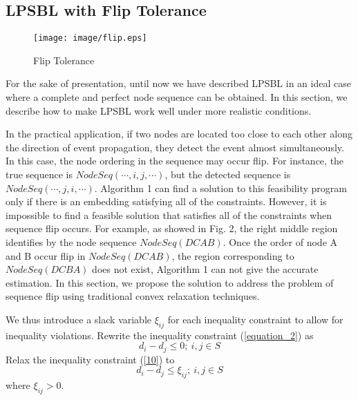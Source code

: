 \subsection{LPSBL with Flip Tolerance }

    \begin{figure}[!htb]
    \centering
 \setlength{\abovecaptionskip}{-15pt}
                     \vspace{-5mm}  
    \texttt{[image: image/flip.eps]} 
	\vspace{10mm}
    \caption{Flip Tolerance}
	\label{fig2}
    \vspace{-5mm}
    \end{figure}

For the sake of presentation, until now we have described LPSBL in an ideal case where a complete and perfect node sequence can be obtained. 
In this section, we describe how to make LPSBL work well under more realistic conditions. 

In the practical application, if two nodes are located too close to each other along the direction of event propagation, they detect the event almost simultaneously. 
In this case, the node ordering in the sequence may occur flip. 
For instance, the true sequence is $NodeSeq ( \cdots ,i,j, \cdots )$, but the detected sequence is $NodeSeq ( \cdots ,j,i, \cdots )$.
Algorithm 1 can find a solution to this feasibility program only if there is an embedding satisfying all of the constraints. 
However, it is impossible to find a feasible solution that satisfies all of the constraints when sequence flip occurs. 
For example, as showed in Fig. 2, the right middle region identifies by the node sequence $NodeSeq (D C A B)$. 
Once the order of node A and B occur flip in $NodeSeq (D C A B)$, the region corresponding to $NodeSeq (D C B A)$ does not exist, Algorithm 1 can not give the accurate estimation.
In this section, we propose the solution to address the problem of sequence flip using traditional convex relaxation techniques.


We thus introduce a slack variable ${\xi _{ij}}$ for each inequality constraint to allow for inequality violations.
Rewrite the inequality constraint (\ref{equation_2}) as
 \begin{equation} \label{10}
 d_i - d_j  \le  0 ; \  i,j \in S
 \end{equation}
 Relax the inequality constraint (\ref{10}) to
 \begin{equation} \label{11}
 d_i - d_j  \le  \xi _{ij} ; \  i,j \in S
 \end{equation}
 where
 \begin{math}
 \xi _{ij}  > 0
 \end{math}.
 
